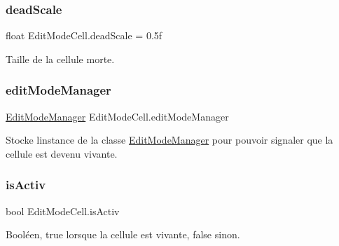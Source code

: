 \subsubsection{\texorpdfstring{dead\+Scale}{deadScale}}
{\footnotesize\ttfamily float Edit\+Mode\+Cell.\+dead\+Scale = 0.\+5f\hspace{0.3cm}{\ttfamily [private]}}



Taille de la cellule morte. 

\mbox{\label{class_edit_mode_cell_ae252461bd35c4e41657659411196652e}} 
\subsubsection{\texorpdfstring{edit\+Mode\+Manager}{editModeManager}}
{\footnotesize\ttfamily \mbox{\hyperlink{class_edit_mode_manager}{Edit\+Mode\+Manager}} Edit\+Mode\+Cell.\+edit\+Mode\+Manager\hspace{0.3cm}{\ttfamily [private]}}



Stocke l\textquotesingle{}instance de la classe \mbox{\hyperlink{class_edit_mode_manager}{Edit\+Mode\+Manager}} pour pouvoir signaler que la cellule est devenu vivante. 

\mbox{\label{class_edit_mode_cell_ae89eac1aaea10fb850196b612fe87943}} 
\subsubsection{\texorpdfstring{is\+Activ}{isActiv}}
{\footnotesize\ttfamily bool Edit\+Mode\+Cell.\+is\+Activ\hspace{0.3cm}{\ttfamily [private]}}



Booléen, true lorsque la cellule est vivante, false sinon. 

\mbox{\label{class_edit_mode_cell_a80c89ea3030a80cb4f2e26accd00c2cb}} 

